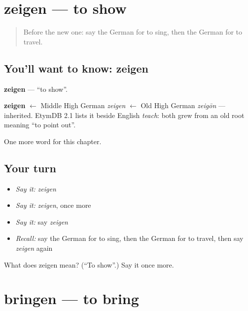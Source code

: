 \section[zeigen]{zeigen — to show}

\label{lesson:GE-C66-zeigen}



\begin{quote}
Before the new one: say the German for to sing, then the German for to travel.
\end{quote}

\subsection*{You'll want to know: zeigen}
\textbf{zeigen} — \textquotedblleft{}to show\textquotedblright{}.

\begin{cousinweb}
\textbf{zeigen} $\leftarrow$ Middle High German \emph{zeigen} $\leftarrow$ Old High German \emph{zeigōn} — inherited. EtymDB 2.1 lists it beside English \emph{teach}: both grew from an old root meaning \textquotedblleft{}to point out\textquotedblright{}.
\end{cousinweb}

\begin{grammarlens}[title={What you've built}]
One more word for this chapter.
\end{grammarlens}

\subsection*{Your turn}
\begin{itemize}
\raggedright
  \item \emph{Say it:} \emph{zeigen}
  \item \emph{Say it:} \emph{zeigen}, once more
  \item \emph{Say it:} say \emph{zeigen}
  \item \emph{Recall:} say the German for to sing, then the German for to travel, then say \emph{zeigen} again
\end{itemize}

\begin{tcolorbox}[breakable,colback=teal!4,colframe=teal!35!black,title={Before you move on}]
What does zeigen mean? (\textquotedblleft{}To show\textquotedblright{}.) Say it once more.
\end{tcolorbox}
\section[bringen]{bringen — to bring}

